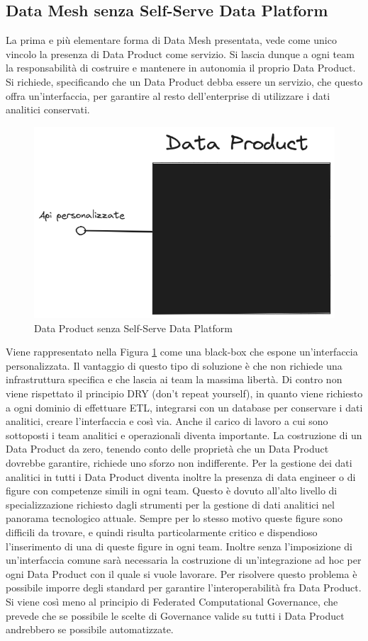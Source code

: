 \documentclass[12pt]{report}
\begin{document}
\subsection{Data Mesh senza Self-Serve Data Platform}
La prima e più elementare forma di Data Mesh presentata, vede come unico vincolo la presenza di Data Product come servizio.
Si lascia dunque a ogni team la responsabilità di costruire e mantenere in autonomia il proprio Data Product.
Si richiede, specificando che un Data Product debba essere un servizio, che questo offra un'interfaccia, per garantire al resto dell'enterprise di utilizzare i dati analitici conservati.
\begin{figure}
    \centering
    \includegraphics[width=0.5\linewidth]{immagini/data mesh elementare.png}
    \caption{Data Product senza Self-Serve Data Platform}
    \label{fig:dp senza SSDP}
\end{figure}

Viene rappresentato nella Figura \ref{fig:dp senza SSDP} come una black-box che espone un'interfaccia personalizzata.
Il vantaggio di questo tipo di soluzione è che non richiede una infrastruttura specifica e che lascia ai team la massima libertà.
Di contro non viene rispettato il principio DRY (don't repeat yourself), in quanto viene richiesto a ogni dominio di effettuare ETL, integrarsi con un database per conservare i dati analitici, creare l'interfaccia e così via.
Anche il carico di lavoro a cui sono sottoposti i team analitici e operazionali diventa importante.
La costruzione di un Data Product da zero, tenendo conto delle proprietà che un Data Product dovrebbe garantire, richiede uno sforzo non indifferente.
Per la gestione dei dati analitici in tutti i Data Product diventa inoltre la presenza di data engineer o di figure con competenze simili in ogni team.
Questo è dovuto all'alto livello di specializzazione richiesto dagli strumenti per la gestione di dati analitici nel panorama tecnologico attuale.
Sempre per lo stesso motivo queste figure sono difficili da trovare, e quindi risulta particolarmente critico e dispendioso l'inserimento di una di queste figure in ogni team.
Inoltre senza l'imposizione di un'interfaccia comune sarà necessaria la costruzione di un'integrazione ad hoc per ogni Data Product con il quale si vuole lavorare. 
Per risolvere questo problema è possibile imporre degli standard per garantire l'interoperabilità fra Data Product.
Si viene così meno al principio di Federated Computational Governance, che prevede che se possibile le scelte di Governance valide su tutti i Data Product andrebbero se possibile automatizzate. 
\end{document}
